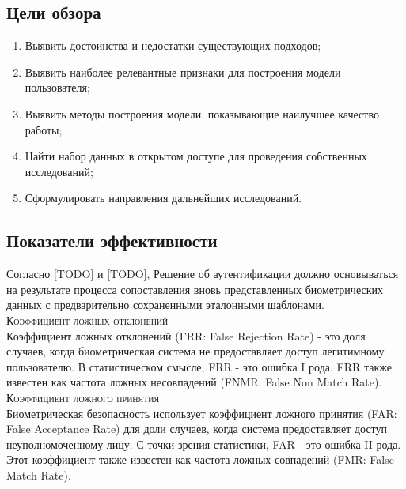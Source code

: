 \documentclass[12pt]{article}
\begin{document}
    \subsection{Цели обзора}
    \label{sec:Overview:Goals}

    \begin{enumerate}
        \item Выявить достоинства и недостатки существующих подходов;
        \item Выявить наиболее релевантные признаки для построения модели пользователя;
        \item Выявить методы построения модели, показывающие наилучшее качество работы;
        \item Найти набор данных в открытом доступе для проведения собственных исследований;
        \item Сформулировать направления дальнейших исследований.
    \end{enumerate}

    \newpage


    \subsection{Показатели эффективности}
    \label{sec:Overview:Metrics}

    \par Согласно [TODO] и [TODO], Решение об аутентификации должно основываться на результате процесса сопоставления вновь представленных биометрических данных с предварительно сохраненными эталонными шаблонами. \\

    \noindent\textsc{Коэффициент ложных отклонений} \\
    \noindent Коэффициент ложных отклонений (FRR: False Rejection Rate) - это доля случаев, когда биометрическая система не предоставляет доступ легитимному пользователю. В статистическом смысле, FRR - это ошибка I рода. FRR также известен как частота ложных несовпадений (FNMR: False Non Match Rate). \\

    \noindent\textsc{Коэффициент ложного принятия} \\
    \noindent Биометрическая безопасность использует коэффициент ложного принятия (FAR: False Acceptance Rate) для доли случаев, когда система предоставляет доступ неуполномоченному лицу. С точки зрения статистики, FAR - это ошибка II рода. Этот коэффициент также известен как частота ложных совпадений (FMR: False Match Rate). \\
\end{document}
